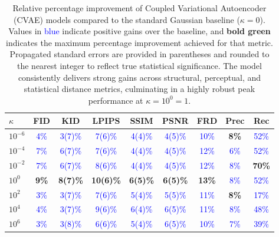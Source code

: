 \documentclass[twoside,11pt]{article}
\begin{document}
\begin{table}[ht!]
\centering
\renewcommand{\arraystretch}{1.4}
\setlength{\tabcolsep}{6pt}
\small
\begin{tabular}{lcccccccc}
\toprule
\rowcolor{gray!20}
\textbf{$\kappa$} & \textbf{FID} & \textbf{KID} & \textbf{LPIPS} & \textbf{SSIM} & \textbf{PSNR} & \textbf{FRD} & \textbf{Prec} & \textbf{Rec} \\
\midrule
$10^{-6}$    & \textcolor{blue}{4\%} & \textcolor{blue}{3(7)\%} & \textcolor{blue}{7(6)\%} & \textcolor{blue}{4(4)\%} & \textcolor{blue}{4(5)\%} & \textcolor{blue}{10\%} & \textbf{\textcolor{green!50!black}{8\%}} & \textcolor{blue}{52\%} \\
$10^{-4}$    & \textcolor{blue}{7\%} & \textcolor{blue}{6(7)\%} & \textcolor{blue}{7(6)\%} & \textcolor{blue}{4(4)\%} & \textcolor{blue}{4(5)\%} & \textcolor{blue}{12\%} & \textcolor{blue}{6\%} & \textcolor{blue}{52\%} \\
$10^{-2}$    & \textcolor{blue}{7\%} & \textcolor{blue}{6(7)\%} & \textcolor{blue}{8(6)\%} & \textcolor{blue}{4(4)\%} & \textcolor{blue}{4(5)\%} & \textcolor{blue}{12\%} & \textcolor{blue}{8\%} & \textbf{\textcolor{green!50!black}{70\%}} \\
$10^{0}$     & \textbf{\textcolor{green!50!black}{9\%}} & \textbf{\textcolor{green!50!black}{8(7)\%}} & \textbf{\textcolor{green!50!black}{10(6)\%}} & \textbf{\textcolor{green!50!black}{6(5)\%}} & \textbf{\textcolor{green!50!black}{6(5)\%}} & \textbf{\textcolor{green!50!black}{13\%}} & \textcolor{blue}{8\%} & \textcolor{blue}{52\%} \\
$10^{2}$     & \textcolor{blue}{3\%} & \textcolor{blue}{3(7)\%} & \textcolor{blue}{7(6)\%} & \textcolor{blue}{5(4)\%} & \textcolor{blue}{5(5)\%} & \textcolor{blue}{11\%} & \textbf{\textcolor{green!50!black}{8\%}} & \textcolor{blue}{17\%} \\
$10^{4}$     & \textcolor{blue}{4\%} & \textcolor{blue}{3(7)\%} & \textcolor{blue}{9(6)\%} & \textcolor{blue}{6(4)\%} & \textcolor{blue}{6(5)\%} & \textcolor{blue}{11\%} & \textcolor{blue}{8\%} & \textcolor{blue}{48\%} \\
$10^{6}$     & \textcolor{blue}{3\%} & \textcolor{blue}{3(8)\%} & \textcolor{blue}{6(6)\%} & \textcolor{blue}{5(4)\%} & \textcolor{blue}{6(5)\%} & \textcolor{blue}{10\%} & \textcolor{blue}{7\%} & \textcolor{blue}{39\%} \\
\bottomrule
\end{tabular}
\caption{Relative percentage improvement of Coupled Variational Autoencoder (CVAE) models compared to the standard Gaussian baseline ($\kappa = 0$). Values in \textcolor{blue}{blue} indicate positive gains over the baseline, and \textbf{\textcolor{green!50!black}{bold green}} indicates the maximum percentage improvement achieved for that metric. Propagated standard errors are provided in parentheses and rounded to the nearest integer to reflect true statistical significance. The model consistently delivers strong gains across structural, perceptual, and statistical distance metrics, culminating in a highly robust peak performance at $\kappa = 10^0 = 1$.}
\label{tab:metrics_improvement} 
\end{table}
\end{document}
